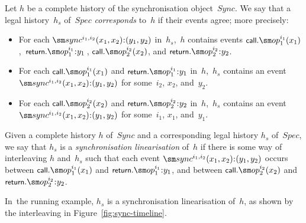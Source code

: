 %
\begin{definition}
Let $h$ be a complete history of the synchronisation object~$Sync$.  We say
that a legal history~$h_s$ of~$Spec$ \emph{corresponds} to~$h$ if their
events agree; more precisely:
\begin{itemize}
\item For each  $\sync^{i_1, i_2}(x_1, x_2)\:: (y_1, y_2)$ in~$h_s$,\,
  $h$ contains events $\call.\op_1^{i_1}(x_1)$,\,
  $\return.\op_1^{i_1}\::y_1$\,, $\call.\op_2^{i_2}(x_2)$, and
  $\return.\op_2^{i_2}\::y_2$.

\item For each $\call.\op_1^{i_1}(x_1)$ and $\return.\op_1^{i_1}\::y_1$
  in~$h$,\, $h_s$ contains an event $\sync^{i_1, i_2}(x_1, x_2)\:: (y_1, y_2)$
  for some~$i_2$, $x_2$, and~$y_2$.

\item For each $\call.\op_2^{i_2}(x_2)$ and $\return.\op_2^{i_2}\::y_2$
  in~$h$,\, $h_s$ contains an event $\sync^{i_1, i_2}(x_1, x_2)\:: (y_1, y_2)$
  for some~$i_1$, $x_1$, and~$y_1$.
\end{itemize}


\end{definition}

\begin{definition}
Given a complete history $h$ of~$Sync$ and a corresponding legal history $h_s$
of~$Spec$, we say that $h_s$ is a \emph{synchronisation linearisation} of~$h$
if there is some way of interleaving $h$ and~$h_s$ such that each event
$\sync^{i_1, i_2}(x_1, x_2)\:: (y_1, y_2)$ occurs between
$\call.\op_1^{i_1}(x_1)$ and $\return.\op_1^{i_1}\::y_1$, and between
$\call.\op_2^{i_2}(x_2)$ and $\return.\op_2^{i_2}\::y_2$.
\end{definition}
%
In~the running example, $h_s$ is a synchronisation
linearisation of~$h$, as shown by the interleaving in
Figure~\ref{fig:sync-timeline}.

